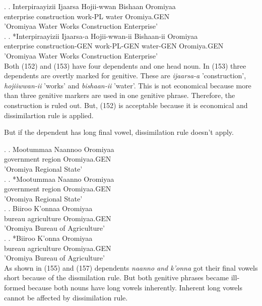 \documentclass[11pt,a4paper]{article}
\begin{document}
	\ex.
	\ag.
	Interpiraayizii Ijaarsa Hojii-wwan Bishaan Oromiyaa\\
	enterprise construction work-PL water Oromiya.GEN\\
	'Oromiyaa Water Works Construction Enterprise'\\
	
	\ex.
	\ag.
	*Interpiraayizii Ijaarsa-a Hojii-wwan-ii Bishaan-ii Oromiyaa\\
	enterprise construction-GEN work-PL-GEN water-GEN Oromiya.GEN\\
	'Oromiyaa Water Works Construction Enterprise'\\
	
	Both (152) and (153) have four dependents and one head noun. In (153) three dependents are overtly marked for genitive. These are \emph{ijaarsa-a} 'construction', \emph{hojiiwwan-ii} 'works' and \emph{bishaan-ii} 'water'. This is not economical because more than three genitive markers are used in one genitive phrase. Therefore, the construction is ruled out. But, (152) is acceptable because it is economical and dissimilartion rule is applied. 
	
	But if the dependent has long final vowel, dissimilation rule doesn't apply.
	
	\ex.
	\ag.
	Mootummaa Naannoo Oromiyaa\\
	government region Oromiyaa.GEN\\
	'Oromiya Regional State'\\
	
	\ex.
	\ag.
	*Mootummaa Naanno Oromiyaa\\
	government region Oromiyaa.GEN\\
	'Oromiya Regional State'\\

	\ex.
	\ag.
	Biiroo K'onnaa Oromiyaa\\
	bureau agriculture Oromiyaa.GEN\\
	'Oromiya Bureau of Agriculture'\\
	
	\ex.
	\ag.
	*Biiroo K'onna Oromiyaa\\
	bureau agriculture Oromiyaa.GEN\\
	'Oromiya Bureau of Agriculture'\\
	
	As shown in (155) and (157) dependents \emph{naanno and k'onna} got their final vowels short because of the dissmilation rule. But both genitive phrases became ill-formed because both nouns have long vowels inherently. Inherent long vowels cannot be affected by dissimilation rule. 
	
\end{document}
